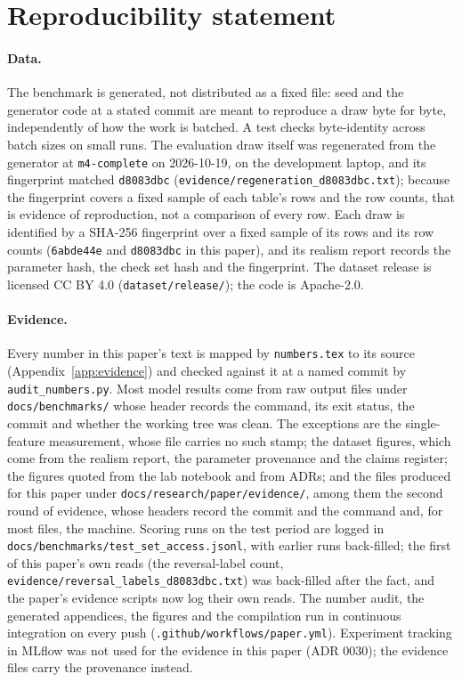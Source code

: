 \section{Reproducibility statement}
\label{sec:repro}

\paragraph{Data.} The benchmark is generated, not distributed as a fixed file: seed \nSeed{} and
the generator code at a stated commit are meant to reproduce a draw byte for byte, independently of
how the work is batched. A test checks byte-identity across batch sizes on small runs. The evaluation
draw itself was regenerated from the generator at \texttt{m4-complete} on 2026-10-19, on the
development laptop, and its fingerprint matched \texttt{d8083dbc}
(\texttt{evidence/\allowbreak regeneration\_\allowbreak d8083dbc.txt}); because the fingerprint
covers a fixed sample of each table's rows and the row counts, that is evidence of reproduction, not
a comparison of every row. Each draw is identified by a SHA-256 fingerprint over a fixed sample of
its rows and its row counts (\texttt{6abde44e} and \texttt{d8083dbc} in this paper), and its realism report records the parameter hash, the check
set hash and the fingerprint. The dataset release is licensed CC BY 4.0
(\texttt{dataset/release/}); the code is Apache-2.0.

\paragraph{Evidence.} Every number in this paper's text is mapped by \texttt{numbers.tex} to its source
(Appendix~\ref{app:evidence}) and checked against it at a named commit by
\texttt{audit\_numbers.py}. Most model results come from raw output files under
\texttt{docs/benchmarks/} whose header records the command, its exit status, the commit and whether
the working tree was clean. The exceptions are the single-feature measurement, whose file carries no
such stamp; the dataset figures, which come from the realism report, the parameter provenance and the
claims register; the figures quoted from the lab notebook and from ADRs; and the files produced for
this paper under \texttt{docs/\allowbreak research/\allowbreak paper/\allowbreak evidence/}, among
them the second round of evidence, whose headers record the commit and the command and, for most
files, the machine. Scoring runs on the test period are logged
in \texttt{docs/benchmarks/test\_set\_access.jsonl}, with earlier runs back-filled; the first of this paper's own reads (the reversal-label count,
\texttt{evidence/\allowbreak reversal\_\allowbreak labels\_\allowbreak d8083dbc.txt}) was back-filled after the fact, and the paper's evidence scripts now log their
own reads. The number
audit, the generated appendices, the figures and the compilation run in continuous integration on
every push (\texttt{.github/\allowbreak workflows/\allowbreak paper.yml}). Experiment
tracking in MLflow was not used for the evidence in this paper (ADR 0030); the evidence files carry the
provenance instead.

